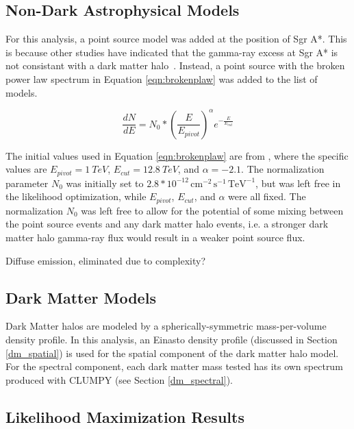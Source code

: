   \FloatBarrier

  \subsection{Non-Dark Astrophysical Models}
  For this analysis, a point source model was added at the position of Sgr A*.
  This is because other studies have indicated that the gamma-ray excess at Sgr A* is not consistant with a dark matter halo~\cite{gc_pnt_is_not_dm1, gc_pnt_is_not_dm2, gc_pnt_is_not_dm3}.
  Instead, a point source with the broken power law spectrum in Equation \ref{eqn:brokenplaw} was added to the list of models.
  
  \begin{equation}\label{eqn:brokenplaw}
    \frac{dN}{dE} = N_{0} * { \left ( \frac{E}{E_{pivot}} \right ) }^{\alpha} {e}^{-\frac{E}{E_{cut}}}
  \end{equation}
  
  The initial values used in Equation \ref{eqn:brokenplaw} are from \cite{VeritasGCRidge2015}, where the specific values are $E_{pivot}=\SI{1}{TeV}$, $E_{cut}=\SI{12.8}{TeV}$, and $\alpha=-2.1$.
  The normalization parameter $N_{0}$ was initially set to $2.8*{10}^{-12}\,\text{cm}^{-2}\,\text{s}^{-1}\,\text{TeV}^{-1}$, but was left free in the likelihood optimization, while $E_{pivot}$, $E_{cut}$, and $\alpha$ were all fixed.
  The normalization $N_{0}$ was left free to allow for the potential of some mixing between the point source events and any dark matter halo events, i.e. a stronger dark matter halo gamma-ray flux would result in a weaker point source flux.
  
  Diffuse emission, eliminated due to complexity?

  \subsection{Dark Matter Models}
  Dark Matter halos are modeled by a spherically-symmetric mass-per-volume density profile.
  In this analysis, an Einasto density profile (discussed in Section \ref{dm_spatial}) is used for the spatial component of the dark matter halo model.
  For the spectral component, each dark matter mass tested has its own spectrum produced with CLUMPY (see Section \ref{dm_spectral}).

  \subsection{Likelihood Maximization Results}
  
